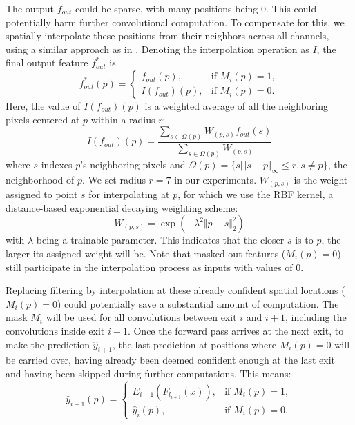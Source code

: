 The output $f_{out}$ could be sparse, with many positions being $0$. 
This could potentially harm further convolutional computation.
To compensate for this, we spatially interpolate these positions from their neighbors across all channels, using a similar approach as in \cite{xie2020spatially}.
Denoting the interpolation operation as $I$, the final output feature $f^*_{out}$ is 
\begin{equation}
f^*_{out}(p)  = 
\begin{cases}
    f_{out}(p), & \text{if } M_i(p) = 1, \\
    I(f_{out})(p),  & \text{if } M_i(p) = 0.
\end{cases}
\end{equation}
Here, the value of $I(f_{out})(p)$ is a weighted average of all the neighboring pixels centered at $p$ within a radius $r$:
\begin{equation}
I(f_{out})(p) = \frac{\sum_{s\in{\Omega(p)}} W_{(p, s)} f_{out}(s)}{\sum_{s\in{\Omega(p)}} W_{(p, s)}}
\end{equation}
where $s$ indexes $p$'s neighboring pixels and $\Omega(p) = \{s | \Vert s-p\Vert_{\infty} \leq r, s \neq p\}$, the neighborhood of $p$. We set radius $r=7$ in our experiments. $W_{(p,s)}$ is the weight assigned to point $s$ for interpolating at $p$, for which we use the RBF kernel, a distance-based exponential decaying weighting scheme:
\begin{equation}
\label{eqn:lambda}
W_{(p,s)} = \exp{(-\lambda^2 \Vert p - s \Vert ^2_2)}
\end{equation}
with $\lambda$ being a trainable parameter.
This indicates that the closer $s$ is to $p$, the larger its assigned weight will be. Note that masked-out features ($M_i(p) = 0$) still participate in the interpolation process as inputs with values of 0.


Replacing filtering by interpolation at these already confident spatial locations ($M_i(p) = 0$) could potentially save a substantial amount of computation.
The mask $M_i$ will be used for all convolutions between exit $i$ and $i+1$, including the convolutions inside exit $i+1$.
Once the forward pass arrives at the next exit, to make the prediction $\hat{y}_{i+1}$, the last prediction at positions where $M_i(p) = 0$ will be carried over, having already been deemed confident enough at the last exit and having been skipped during further computations.
This means:
\begin{equation}
\label{eqn:carry}
\hat{y}_{i+1}(p)  = 
\begin{cases}
    E_{i+1}(F_{l_{i+1}}(x)), & \text{if } M_i(p) = 1, \\
    \hat{y}_{i}(p),  & \text{if } M_i(p) = 0.
\end{cases}
\end{equation}

